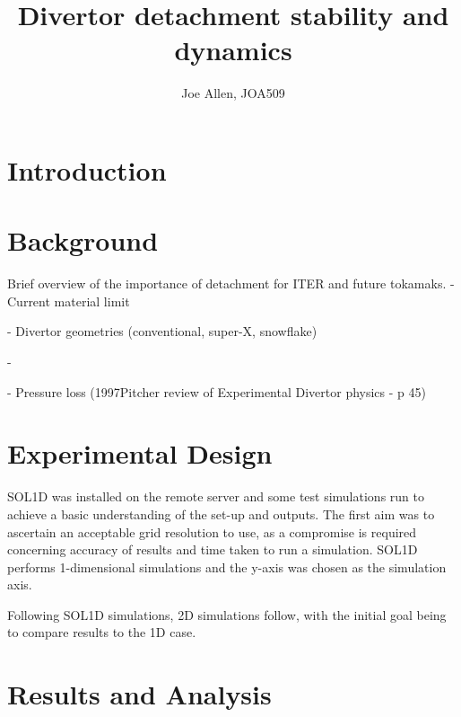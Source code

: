 \documentclass[11pt, twocolumn]{article}  %
\begin{document}
\title{Divertor detachment stability and dynamics}
\author{Joe Allen, JOA509}



\section{Introduction}\label{sec:Intro}

\section{Background}\label{sec:Bg}
Brief overview of the importance of detachment for ITER and future tokamaks.
- Current material limit

- Divertor geometries (conventional, super-X, snowflake)

- 

- Pressure loss (1997Pitcher review of Experimental Divertor physics - p 45)


\section{Experimental Design}\label{sec:Expt}
SOL1D was installed on the remote server and some test simulations run to achieve a basic understanding of the set-up and outputs. The first aim was to ascertain an acceptable grid resolution to use, as a compromise is required concerning accuracy of results and time taken to run a simulation. SOL1D performs 1-dimensional simulations and the y-axis was chosen as the simulation axis. 

Following SOL1D simulations, 2D simulations follow, with the initial goal being to compare results to the 1D case.

\section{Results and Analysis}\label{sec:Results}
\end{document}
